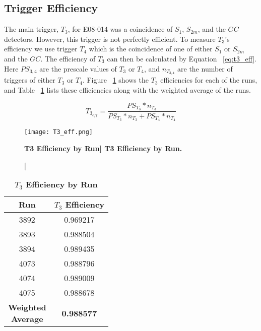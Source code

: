 \subsection{Trigger Efficiency}
\label{ssec:trigger_eff}

The main trigger, $T_3$, for E08-014 was a coincidence of $S_1$, $S_{2m}$, and the $GC$ detectors. However, this trigger is not perfectly efficient. To measure $T_3$'s efficiency we use trigger $T_4$ which is the coincidence of one of either $S_1$ or $S_{2m}$ and the $GC$. The efficiency of $T_3$ can then be calculated by Equation ~\ref{eq:t3_eff}. Here $PS_{3,4}$ are the prescale values of $T_3$ or $T_4$, and $n_{T_{3,4}}$ are the number of triggers of either $T_3$ or $T_4$. Figure ~\ref{fig:t3_eff} shows the $T_3$ efficiencies for each of the runs, and Table ~\ref{tab:t3_eff} lists these efficiencies along with the weighted average of the runs. 

\begin{equation} \label{eq:t3_eff}
	T_{3_{eff}} = \frac{PS_{T_3}*n_{T_3}}{PS_{T_3}*n_{T_3}+PS_{T_4}*n_{T_4}}
\end{equation}

\begin{figure}[!ht]
\begin{center}
\texttt{[image: T3\_eff.png]}
\end{center}
\caption[\bf{T3 Efficiency by Run}]{
{\bf{T3 Efficiency by Run.}} }
\label{fig:t3_eff}
\end{figure}

\begin{table}[!h]
\centering
\begin{tabular}{|c c|}
\hline
\textbf{Run} & \textbf{$T_3$ Efficiency}\\
\hline
3892 & 0.969217\\
3893 & 0.988504\\
3894 & 0.989435\\
4073 & 0.988796\\
4074 & 0.989009\\
4075 & 0.988678\\   
\hline
\makecell{\textbf{Weighted}\\ \textbf{Average}} & \textbf{0.988577} \\
\hline
\end{tabular}
\caption{{\bf{$T_3$ Efficiency by Run}} }
\label{tab:t3_eff}
\end{table}

